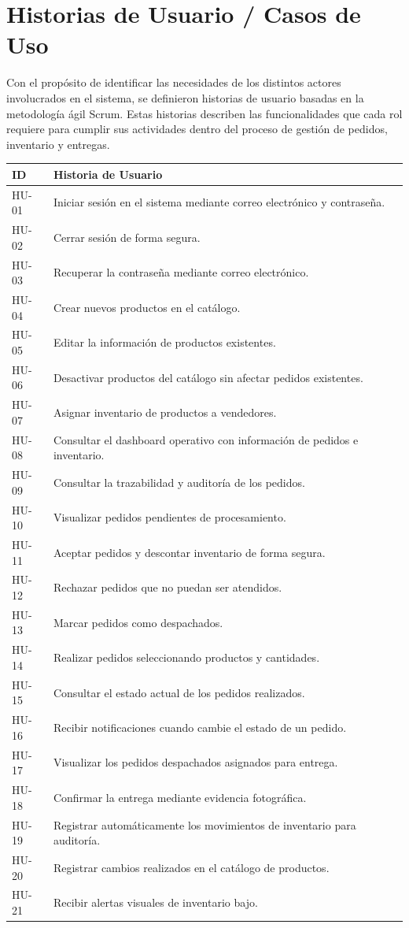 \documentclass[12pt,a4paper]{report}
\begin{document}
\section{Historias de Usuario / Casos de Uso}

Con el propósito de identificar las necesidades de los distintos actores involucrados en el sistema, se definieron historias de usuario basadas en la metodología ágil Scrum. Estas historias describen las funcionalidades que cada rol requiere para cumplir sus actividades dentro del proceso de gestión de pedidos, inventario y entregas.

\begin{longtable}{|p{2cm}|p{12cm}|}
\hline
\textbf{ID} & \textbf{Historia de Usuario} \\ \hline
HU-01 & Iniciar sesión en el sistema mediante correo electrónico y contraseña. \\ \hline
HU-02 & Cerrar sesión de forma segura. \\ \hline
HU-03 & Recuperar la contraseña mediante correo electrónico. \\ \hline
HU-04 & Crear nuevos productos en el catálogo. \\ \hline
HU-05 & Editar la información de productos existentes. \\ \hline
HU-06 & Desactivar productos del catálogo sin afectar pedidos existentes. \\ \hline
HU-07 & Asignar inventario de productos a vendedores. \\ \hline
HU-08 & Consultar el dashboard operativo con información de pedidos e inventario. \\ \hline
HU-09 & Consultar la trazabilidad y auditoría de los pedidos. \\ \hline
HU-10 & Visualizar pedidos pendientes de procesamiento. \\ \hline
HU-11 & Aceptar pedidos y descontar inventario de forma segura. \\ \hline
HU-12 & Rechazar pedidos que no puedan ser atendidos. \\ \hline
HU-13 & Marcar pedidos como despachados. \\ \hline
HU-14 & Realizar pedidos seleccionando productos y cantidades. \\ \hline
HU-15 & Consultar el estado actual de los pedidos realizados. \\ \hline
HU-16 & Recibir notificaciones cuando cambie el estado de un pedido. \\ \hline
HU-17 & Visualizar los pedidos despachados asignados para entrega. \\ \hline
HU-18 & Confirmar la entrega mediante evidencia fotográfica. \\ \hline
HU-19 & Registrar automáticamente los movimientos de inventario para auditoría. \\ \hline
HU-20 & Registrar cambios realizados en el catálogo de productos. \\ \hline
HU-21 & Recibir alertas visuales de inventario bajo. \\ \hline
\end{longtable}
\end{document}
